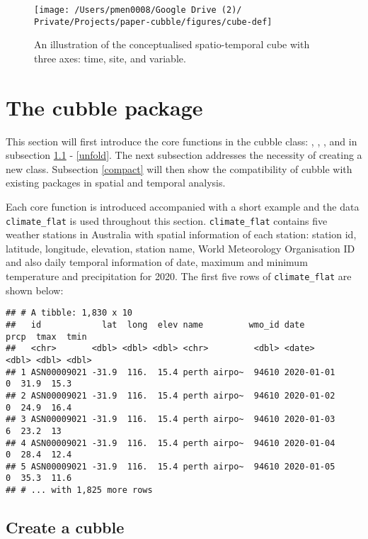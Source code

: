 \documentclass{article}
\begin{document}
\begin{figure}

{\centering \texttt{[image: /Users/pmen0008/Google Drive (2)/ Private/Projects/paper-cubble/figures/cube-def]} 

}

\caption{An illustration of the conceptualised spatio-temporal cube with three axes: time, site, and variable.}\label{fig:cube-def}
\end{figure}

\hypertarget{cubble}{%
\section{The cubble package}\label{cubble}}

This section will first introduce the core functions in the cubble class: , , , and  in subsection \ref{create} - \ref{unfold}. The next subsection addresses the necessity of creating a new class. Subsection \ref{compact} will then show the compatibility of cubble with existing packages in spatial and temporal analysis.

Each core function is introduced accompanied with a short example and the data \texttt{climate\_flat} is used throughout this section. \texttt{climate\_flat} contains five weather stations in Australia with spatial information of each station: station id, latitude, longitude, elevation, station name, World Meteorology Organisation ID and also daily temporal information of date, maximum and minimum temperature and precipitation for 2020. The first five rows of \texttt{climate\_flat} are shown below:

\begin{verbatim}
## # A tibble: 1,830 x 10
##   id            lat  long  elev name         wmo_id date        prcp  tmax  tmin
##   <chr>       <dbl> <dbl> <dbl> <chr>         <dbl> <date>     <dbl> <dbl> <dbl>
## 1 ASN00009021 -31.9  116.  15.4 perth airpo~  94610 2020-01-01     0  31.9  15.3
## 2 ASN00009021 -31.9  116.  15.4 perth airpo~  94610 2020-01-02     0  24.9  16.4
## 3 ASN00009021 -31.9  116.  15.4 perth airpo~  94610 2020-01-03     6  23.2  13  
## 4 ASN00009021 -31.9  116.  15.4 perth airpo~  94610 2020-01-04     0  28.4  12.4
## 5 ASN00009021 -31.9  116.  15.4 perth airpo~  94610 2020-01-05     0  35.3  11.6
## # ... with 1,825 more rows
\end{verbatim}

\hypertarget{create}{%
\subsection{Create a cubble}\label{create}}
\end{document}
